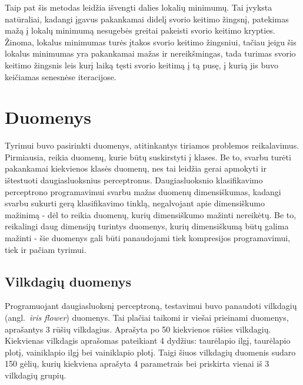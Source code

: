 \documentclass{VUMIFPSbakalaurinis}
\begin{document}
Taip pat šis metodas leidžia išvengti dalies lokalių minimumų.
Tai įvyksta natūraliai, kadangi įgavus pakankamai didelį svorio keitimo žingsnį, patekimas mažą į lokalų minimumą nesugebės greitai pakeisti svorio keitimo krypties.
Žinoma, lokalus minimumas turės įtakos svorio keitimo žingsniui, tačiau jeigu šis lokalus minimumas yra pakankamai mažas ir nereikšmingas, tada turimas svorio keitimo žingsnis leis kurį laiką tęsti svorio keitimą į tą pusę, į kurią jis buvo keičiamas senesnėse iteracijose.




\section{Duomenys}

Tyrimui buvo pasirinkti duomenys, atitinkantys tiriamos problemos reikalavimus.
Pirmiausia, reikia duomenų, kurie būtų suskirstyti į klases.
Be to, svarbu turėti pakankamai kiekvienos klasės duomenų, nes tai leidžia gerai apmokyti ir ištestuoti daugiasluoksnius perceptronus.
Daugiasluoksnio klasifikavimo perceptrono programavimui svarbu mažas duomenų dimensiškumas, kadangi svarbu sukurti gerą klasifikavimo tinklą, negalvojant apie dimensiškumo mažinimą - dėl to reikia duomenų, kurių dimensiškumo mažinti nereikėtų.
Be to, reikalingi daug dimensijų turintys duomenys, kurių dimensiškumą būtų galima mažinti - šie duomenys gali būti panaudojami tiek kompresijos programavimui, tiek ir pačiam tyrimui.



\subsection{Vilkdagių duomenys}

Programuojant daugiasluoksnį perceptroną, testavimui buvo panaudoti vilkdagių (angl.~\textit{iris flower}) duomenys.
Tai plačiai taikomi ir viešai prieinami duomenys, aprašantys 3 rūšių vilkdagius.
Aprašyta po 50 kiekvienos rūšies vilkdagių.
Kiekvienas vilkdagis aprašomas pateikiant 4 dydžius: taurėlapio ilgį, taurėlapio plotį, vainiklapio ilgį bei vainiklapio plotį.
Taigi šiuos vilkdagių duomenis sudaro 150 gėlių, kurių kiekviena aprašyta 4 parametrais bei priskirta vienai iš 3 vilkdagių grupių.
\end{document}
